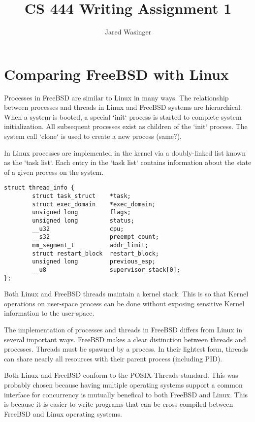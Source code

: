\documentclass[onecolumn,10pt]{IEEETran}
\title{CS 444 Writing Assignment 1}
\author{Jared Wasinger}
\begin{document}
\maketitle

\section{Comparing FreeBSD with Linux}

	Processes in FreeBSD are similar to Linux in many ways.  The relationship between processes and threads in Linux and FreeBSD systems are hierarchical.  When a system is booted, a special `init` process is started to complete system initialization.  All subsequent processes exist as children of the `init` process.  The system call `clone` is used to create a new process (same?).

	In Linux processes are implemented in the kernel via a doubly-linked list known as the `task list`.  Each entry in the `task list` contains information about the state of a given process on the system.

\begin{lstlisting}
struct thread_info {
        struct task_struct    *task;
        struct exec_domain    *exec_domain;
        unsigned long         flags;
        unsigned long         status;
        __u32                 cpu;
        __s32                 preempt_count;
        mm_segment_t          addr_limit;
        struct restart_block  restart_block;
        unsigned long         previous_esp;
        __u8                  supervisor_stack[0];
};
\end{lstlisting}

	Both Linux and FreeBSD threads maintain a kernel stack.  This is so that Kernel operations on user-space process can be done without exposing sensitive Kernel information to the user-space.

	The implementation of processes and threads in FreeBSD differs from Linux in several important ways.  
	FreeBSD makes a clear distinction between threads and processes.  Threads must be spawned by a process.  In their lightest form, threads can share nearly all resources with their parent process (including PID).

	Both Linux and FreeBSD conform to the POSIX Threads standard.  This was probably chosen because  having multiple operating systems support a common interface for concurrency is mutually benefical to both FreeBSD and Linux.  This is because it is easier to write programs that can be cross-compiled between FreeBSD and Linux operating systems.
\end{document}
